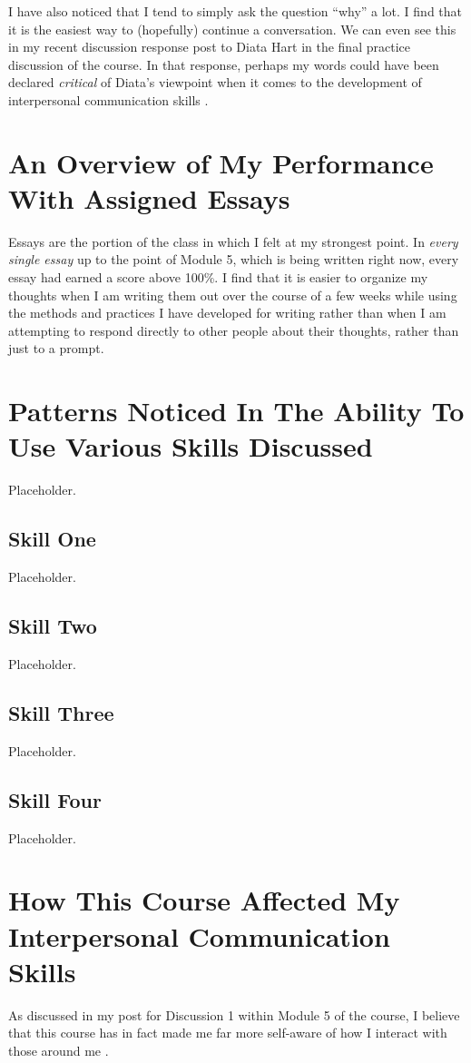   I have also noticed that I tend to simply ask the question ``why'' a lot.
    I find that it is the easiest way to (hopefully) continue a conversation.
    We can even see this in my recent discussion response post to Diata Hart
    in the final practice discussion of the course. In that response, perhaps
    my words could have been declared \textit{critical} of Diata's viewpoint
    when it comes to the development of interpersonal communication skills
    \parencite{hellwig_diata_2020}.


\section{An Overview of My Performance With Assigned Essays}
  Essays are the portion of the class in which I felt at my strongest point.
    In \textit{every single essay} up to the point of Module 5, which is being
    written right now, every essay had earned a score above 100\%. I find that
    it is easier to organize my thoughts when I am writing them out over the
    course of a few weeks while using the methods and practices I have developed
    for writing rather than when I am attempting to respond directly to
    other people about their thoughts, rather than just to a prompt.


\section{Patterns Noticed In The Ability To Use Various Skills Discussed}
  Placeholder.

  \subsection{Skill One}
    Placeholder.

  \subsection{Skill Two}
    Placeholder.

  \subsection{Skill Three}
    Placeholder.

  \subsection{Skill Four}
    Placeholder.


\section{How This Course Affected My Interpersonal Communication Skills}
  As discussed in my post for Discussion 1 within Module 5 of the course, I
    believe that this course has in fact made me far more self-aware of how I
    interact with those around me \parencite{hellwig_m5d2_2020}.
